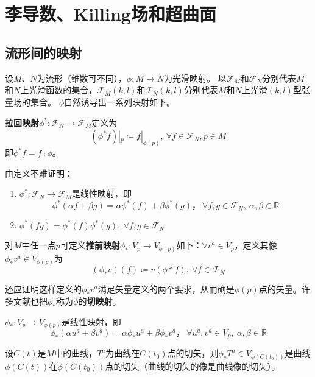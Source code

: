 \chapter[李导数、Killing场和超曲面]{\\李导数、Killing场和超曲面}

\section{流形间的映射}

设$M$、$N$为流形（维数可不同），$\phi \colon M \to N$为光滑映射。
以$\mathscr{F}_M$和$\mathscr{F}_N$分别代表$M$和$N$上光滑函数的集合，$\mathscr{F}_M(k, l)$和$\mathscr{F}_N(k, l)$分别代表$M$和$N$上光滑$(k,l)$型张量场的集合。
$\phi$自然诱导出一系列映射如下。

\begin{definition}
	\textbf{拉回映射}$\phi^* \colon \mathscr{F}_N \to \mathscr{F}_M$定义为
	$$(\phi^*f)|_p \coloneq f|_{\phi(p)}, ~ \forall f \in \mathscr{F}_N, p \in M$$
	即$\phi^*f = f \comp \phi$。
\end{definition}

由定义不难证明：
\begin{enumerate}[（1）]
	\item $\phi^* \colon \mathscr{F}_N \to \mathscr{F}_M$是线性映射，即
	      $$\phi^*(\alpha f + \beta g) = \alpha\phi^*(f) + \beta\phi^*(g)， ~ \forall f,g \in \mathscr{F}_N, ~ \alpha,\beta \in \mathbb{R}$$
	\item $\phi^*(fg) = \phi^*(f)\phi^*(g), ~ \forall f,g \in \mathscr{F}_N$
\end{enumerate}

\begin{definition}
	对$M$中任一点$p$可定义\textbf{推前映射}$\phi_* \colon V_p \to V_{\phi(p)}$如下：$\forall v^a \in V_p$，定义其像$\phi_*v^a \in V_{\phi(p)}$为
	$$(\phi_*v)(f) \coloneq v(\phi*f), ~ \forall f \in \mathscr{F}_N$$
\end{definition}

还应证明这样定义的$\phi_*v^a$满足矢量定义的两个要求，从而确是$\phi(p)$点的矢量。许多文献也把$\phi_*$称为$\phi$的\textbf{切映射}。

\begin{theorem}
	$\phi_* \colon V_p \to V_{\phi(p)}$是线性映射，即
	$$\phi_*(\alpha u^a + \beta v^a) = \alpha\phi_*u^a + \beta\phi_*v^a， ~ \forall u^a,v^a \in V_p, ~ \alpha,\beta \in \mathbb{R}$$
\end{theorem}

\begin{theorem}
	设$C(t)$是$M$中的曲线，$T^a$为曲线在$C(t_0)$点的切矢，则$\phi_*T^a \in V_{\phi(C(t_0))}$是曲线$\phi(C(t))$在$\phi(C(t_0))$点的切矢（曲线的切矢的像是曲线像的切矢）。
\end{theorem}

